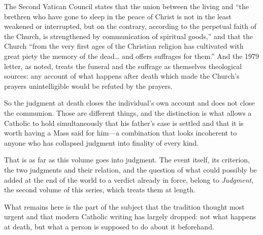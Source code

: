 The Second Vatican Council states that the union between the living and ``the brethren who have gone to sleep in the peace of Christ is not in the least weakened or interrupted, but on the contrary, according to the perpetual faith of the Church, is strengthened by communication of spiritual goods,'' and that the Church ``from the very first ages of the Christian religion has cultivated with great piety the memory of the dead\ldots{} and offers suffrages for them.'' And the 1979 letter, as noted, treats the funeral and the suffrage as themselves theological sources: any account of what happens after death which made the Church's prayers unintelligible would be refuted by the prayers.

So the judgment at death closes the individual's own account and does not close the communion. Those are different things, and the distinction is what allows a Catholic to hold simultaneously that his father's case is settled and that it is worth having a Mass said for him---a combination that looks incoherent to anyone who has collapsed judgment into finality of every kind.

That is as far as this volume goes into judgment. The event itself, its criterion, the two judgments and their relation, and the question of what could possibly be added at the end of the world to a verdict already in force, belong to \emph{Judgment}, the second volume of this series, which treats them at length.

What remains here is the part of the subject that the tradition thought most urgent and that modern Catholic writing has largely dropped: not what happens at death, but what a person is supposed to do about it beforehand.
